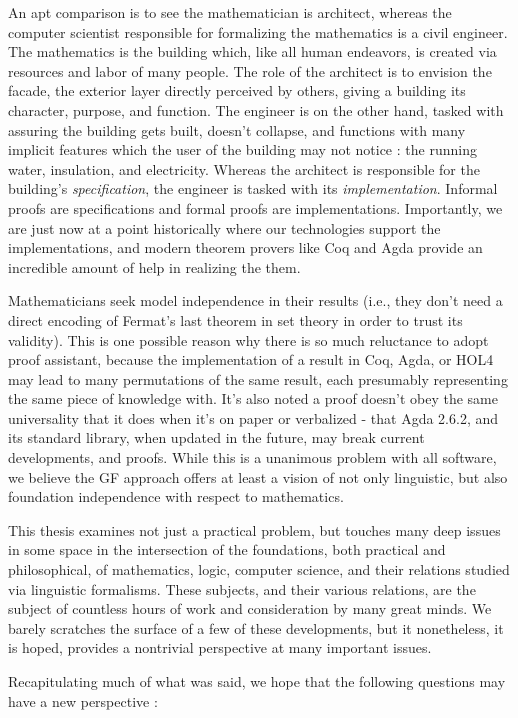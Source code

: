 An apt comparison is to see the mathematician is architect, whereas the computer
scientist responsible for formalizing the mathematics is a civil engineer. The
mathematics is the building which, like all human endeavors, is created via
resources and labor of many people. The role of the architect is to envision the
facade, the exterior layer directly perceived by others, giving a building its
character, purpose, and function. The engineer is on the other hand, tasked with
assuring the building gets built, doesn't collapse, and functions with many
implicit features which the user of the building may not notice : the running
water, insulation, and electricity. Whereas the architect is responsible for the
building's \emph{specification}, the engineer is tasked with its
\emph{implementation}.  Informal proofs are specifications and formal proofs are implementations.
Importantly, we are just now at a point historically where our technologies support the
implementations, and modern theorem provers like Coq and Agda provide an incredible
amount of help in realizing the them.

Mathematicians seek model independence in their results (i.e., they don't need a
direct encoding of Fermat's last theorem in set theory in order to trust its
validity). This is one possible reason why there is so much reluctance to adopt
proof assistant, because the implementation of a result in Coq, Agda, or HOL4
may lead to many permutations of the same result, each presumably representing
the same piece of knowledge with. It's also noted a proof doesn't obey the same
universality that it does when it's on paper or verbalized - that Agda 2.6.2,
and its standard library, when updated in the future, may break current
developments, and proofs. While this is a unanimous problem with all software,
we believe the GF approach offers at least a vision of not only linguistic, but
also foundation independence with respect to mathematics.

This thesis examines not just a practical problem, but touches many deep issues in
some space in the intersection of the foundations, both practical and
philosophical, of mathematics, logic, computer science, and their relations
studied via linguistic formalisms. These subjects, and their various relations,
are the subject of countless hours of work and consideration by many great
minds. We barely scratches the surface of a few of these developments,
but it nonetheless, it is hoped, provides a nontrivial perspective at many
important issues.

Recapitulating much of what was said, we hope that the following questions may
have a new perspective :

